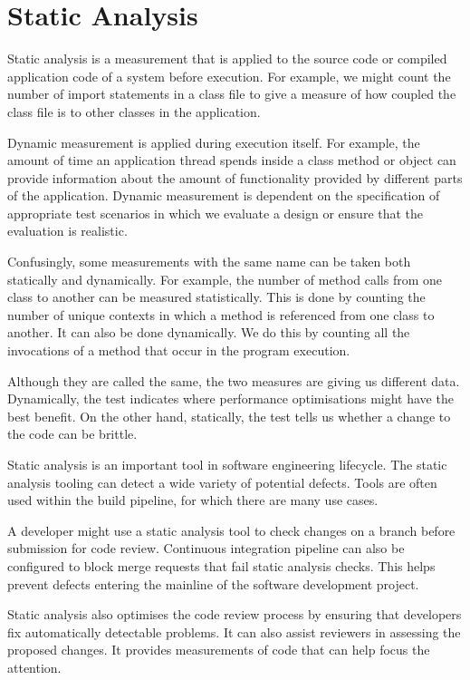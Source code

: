 \documentclass[a4paper, openany]{memoir}
\begin{document}
\chapter{Static Analysis}
Static analysis is a measurement that is applied to the source code or compiled application code of a system before execution. For example, we might count the number of import statements in a class file to give a measure of how coupled the class file is to other classes in the application.

Dynamic measurement is applied during execution itself. For example, the amount of time an application thread spends inside a class method or object can provide information about the amount of functionality provided by different parts of the application. Dynamic measurement is dependent on the specification of appropriate test scenarios in which we evaluate a design or ensure that the evaluation is realistic.

Confusingly, some measurements with the same name can be taken both statically and dynamically. For example, the number of method calls from one class to another can be measured statistically. This is done by counting the number of unique contexts in which a method is referenced from one class to another. It can also be done dynamically. We do this by counting all the invocations of a method that occur in the program execution. 

Although they are called the same, the two measures are giving us different data. Dynamically, the test indicates where performance optimisations might have the best benefit. On the other hand, statically, the test tells us whether a change to the code can be brittle.

Static analysis is an important tool in software engineering lifecycle. The static analysis tooling can detect a wide variety of potential defects. Tools are often used within the build pipeline, for which there are many use cases. 

A developer might use a static analysis tool to check changes on a branch before submission for code review. Continuous integration pipeline can also be configured to block merge requests that fail static analysis checks. This helps prevent defects entering the mainline of the software development project. 

Static analysis also optimises the code review process by ensuring that developers fix automatically detectable problems. It can also assist reviewers in assessing the proposed changes. It provides measurements of code that can help focus the attention.
\end{document}
